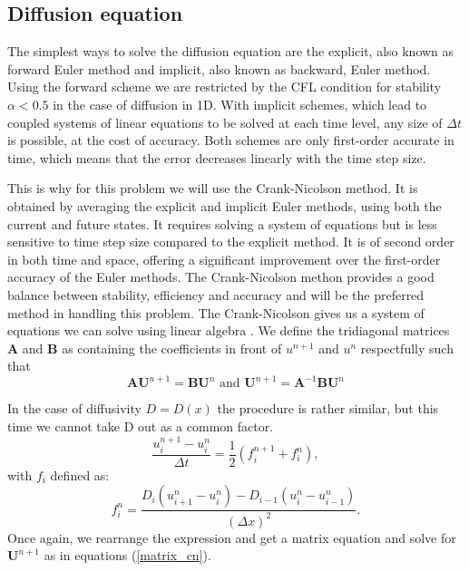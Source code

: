 \documentclass[5p,sort&compress]{elsarticle}
\numberwithin{equation}{subsection}
\begin{document}
\subsection{Diffusion equation}
The simplest ways to solve the diffusion equation are the explicit, also known as forward Euler method and implicit, also known as backward, Euler method. Using the forward scheme we are restricted by the CFL condition for stability $\alpha<0.5$ in the case of diffusion in 1D. With implicit schemes, which lead to coupled systems of linear equations to be solved at each time level, any size of $\Delta t$ is possible, at the cost of accuracy. Both schemes are only first-order accurate in time, which means that the error decreases linearly with the time step size. 

This is why for this problem we will use the Crank-Nicolson method. It is obtained by averaging the explicit and implicit Euler methods, using both the current and future states. It requires solving a system of equations but is less sensitive to time step size compared to the explicit method. It is of second order in both time and space, offering a significant improvement over the first-order accuracy of the Euler methods. The Crank-Nicolson methon provides a good balance between stability, efficiency and accuracy and will be the preferred method in handling this problem. The Crank-Nicolson gives us a system of equations we can solve using linear algebra \cite{presentation1}. We define the tridiagonal matrices \textbf{A} and \textbf{B} as containing the coefficients in front of $u^{n+1}$ and $u^{n}$ respectfully such that
\begin{equation}
    \textbf{A}\textbf{U}^{n+1} = \textbf{B}\textbf{U}^{n} \text{ and }    \textbf{U}^{n+1} = \textbf{A}^{-1}\textbf{B}\textbf{U}^{n} 
    \label{matrix_cn}
\end{equation}

In the case of diffusivity $D = D(x)$ the procedure is rather similar, but this time we cannot take D out as a common factor. 
\begin{equation}
    \frac{u_i^{n+1} - u_i^n}{\Delta t} = \frac{1}{2} \left( f_i^{n+1} + f_i^n \right),
    \label{variable_D}
\end{equation}
with $f_i$ defined as:
\begin{equation}
    f_i^n = \frac{D_i \left( u_{i+1}^n - u_i^n \right) - D_{i-1} \left( u_i^n - u_{i-1}^n \right)}{(\Delta x)^2}.
    \label{change_function}
\end{equation}
Once again, we rearrange the expression and get a matrix equation and solve for $\mathbf{U}^{n+1}$ as in equations (\ref{matrix_cn}).
\end{document}
